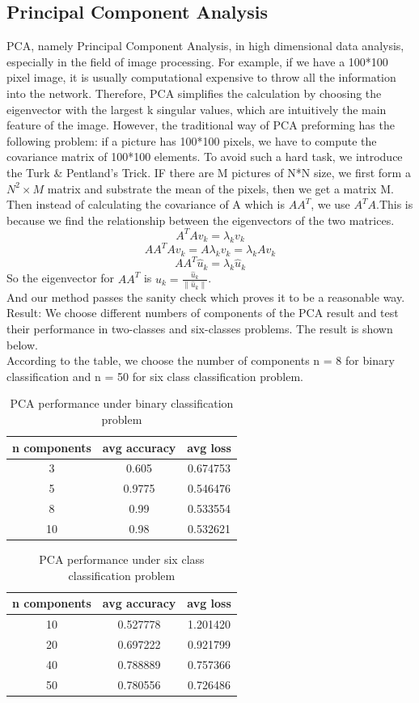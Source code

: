 \documentclass{article} %
\begin{document}
\subsection {Principal Component Analysis}
PCA, namely Principal Component Analysis, in high dimensional data analysis, especially in the field of image processing. For example, if we have a 100*100 pixel image, it is usually computational expensive to throw all the information into the network. Therefore, PCA simplifies the calculation by choosing the eigenvector with the largest k singular values, which are intuitively the main feature of the image. However, the traditional way of PCA preforming has the following problem: if a picture has 100*100 pixels, we have to compute the covariance matrix of 100*100 elements. To avoid such a hard task, we introduce the Turk \& Pentland’s Trick. IF there are M pictures of N*N size, we first form a  $N^2 \times M$ matrix and substrate the mean of the pixels, then we get a matrix M.
Then instead of calculating the covariance of A which is $AA^T$, we use $A^TA$.This is because we find the relationship between the eigenvectors of the two matrices.
$$A^{T} A v_{k}=\lambda_{k} v_{k}$$
$$A A^{T} A v_{k}=A \lambda_{k} v_{k}=\lambda_{k} A v_{k}$$
$$A A^{T} \hat{u}_{k}=\lambda_{k} \hat{u}_{k}$$
So the eigenvector for $A A^{T}$ is $u_{k}=\frac{\hat{u}_{k}}{\left\|\hat{u}_{k}\right\|}$.\\
And our method passes the sanity check which proves it to be a reasonable way.
Result: We choose different numbers of components of the PCA result and test their performance in two-classes and six-classes problems. The result is shown below.\\
According to the table, we choose the number of components n = 8 for binary classification and n = 50 for six class classification problem.
\begin{table}[!htbp]
\centering
\begin{tabular}{ccc}
\hline
n components&avg accuracy& avg loss\\
\hline
3& 0.605& 0.674753\\
5& 0.9775& 0.546476\\
8&0.99&0.533554\\
10&0.98& 0.532621\\
\hline
\end{tabular}
\caption{PCA performance under binary classification problem}
\end{table}
\begin{table}[!htbp]
	\centering
	\begin{tabular}{ccc}
		\hline
		n components&avg accuracy& avg loss\\
		\hline
		10& 0.527778& 1.201420\\
		20& 0.697222& 0.921799\\
		40& 0.788889& 0.757366\\
		50& 0.780556& 0.726486\\
		\hline
	\end{tabular}
	\caption{PCA performance under six class classification problem}
\end{table}
\end{document}
